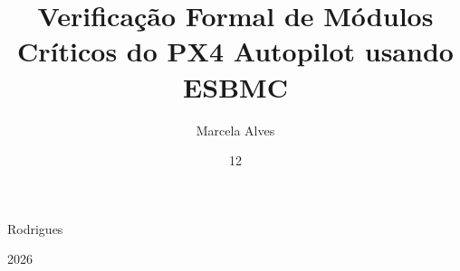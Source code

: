 \title{Verificação Formal de Módulos Críticos do PX4 Autopilot usando ESBMC}


\author{Marcela Alves}{Rodrigues}





\date{12}{2026}

\maketitle

\renewcommand\makefrontpage{%
  \thispagestyle{empty}
  \vspace*{\fill}
  \begin{center}Ficha Catalográfica\end{center}
  \begin{center}
  \fbox{\begin{minipage}{110mm}\vspace*{25mm}
  \vspace*{25mm}\end{minipage}}
  \end{center}
  \vspace*{\fill}
  \clearpage
  \thispagestyle{empty}
  \begin{center}FOLHA DE APROVAÇÃO\end{center}
  \vspace*{10mm}
  \begin{center}
  {\large\textbf{Marcela Alves Rodrigues}}\\[8mm]
  {\large\textbf{Verificação Formal de Módulos Críticos do PX4 Autopilot usando ESBMC}}\\[12mm]
  \end{center}
  \begin{center}
  BANCA EXAMINADORA\\[8mm]
  Prof. Dr. Lucas Carvalho Cordeiro --- Presidente (Orientador)\\
  PPGEE --- Universidade Federal do Amazonas (UFAM)\\[6mm]
  Prof. Dr. Raimundo da Silva Barreto --- Membro\\
  PPGI --- Universidade Federal do Amazonas (UFAM)\\[6mm]
  Prof. Dr. Yuri Bessa --- Membro\\
  PPGEE --- Universidade Federal do Amazonas (UFAM)\\[10mm]
  \end{center}
  \vspace*{\fill}
  \clearpage
  \thispagestyle{empty}
  \vspace*{\fill}
  \mbox{}
  \vspace*{\fill}
  \clearpage}

